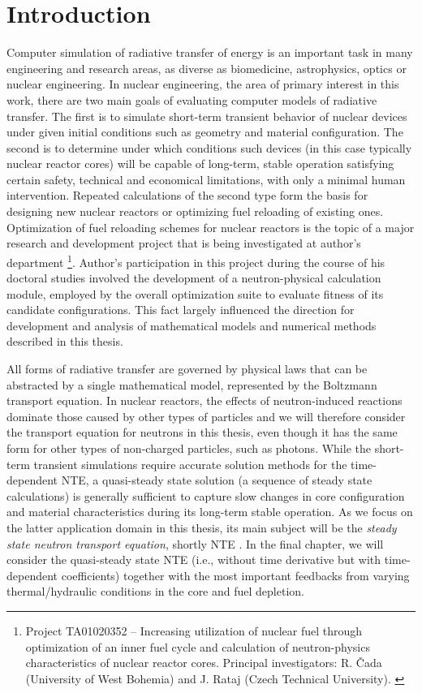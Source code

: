 \chapter{Introduction}

Computer simulation of radiative transfer of energy is an important task in many engineering and research areas, as
diverse as biomedicine, astrophysics, optics or nuclear engineering. In nuclear engineering, the area of primary
interest in this work, there are two main goals of evaluating computer models of radiative transfer. The first is
to simulate short-term transient behavior of nuclear devices under given initial conditions such as geometry and material
configuration. The second is to determine under which conditions such devices (in this case typically nuclear reactor
cores) will be capable of long-term, stable operation satisfying certain safety, technical and economical limitations,
with only a minimal human intervention. Repeated calculations of the second type form the basis for designing new
nuclear reactors or optimizing fuel reloading of existing ones. Optimization of fuel reloading schemes for nuclear
reactors is the topic of a major research and development project that is being investigated at author's department
\footnote{Project TA01020352 -- Increasing utilization of nuclear fuel through optimization of an inner fuel cycle and
calculation of neutron-physics characteristics of nuclear reactor cores. Principal investigators: R. {\v C}ada
(University of West Bohemia) and J. Rataj (Czech Technical University). \label{ftn:TACR}}.
Author's participation in this project during the course of his doctoral studies involved the development of a
neutron-physical calculation module, employed by the overall optimization suite to evaluate fitness of its candidate
configurations. This fact largely influenced the direction for development and analysis of mathematical models and
numerical methods described in this thesis.

All forms of radiative transfer are governed by physical laws that can be abstracted by a single mathematical model,
represented by the Boltzmann transport equation. In nuclear reactors, the effects of neutron-induced reactions dominate
those caused by other types of particles and we will therefore consider the transport equation for neutrons in this 
thesis, even though it has the same form for other types of non-charged particles, such as photons. While the
short-term transient simulations require accurate solution methods for the time-dependent NTE, a quasi-steady state solution (a sequence of steady state calculations) is generally sufficient
to capture slow changes in core configuration and material characteristics during its long-term stable operation.
As we focus on the latter application domain in this thesis, its main subject will be the \textit{steady
state neutron transport equation}, shortly NTE . In the final chapter, we will consider the quasi-steady
state NTE (i.e., without time derivative but with time-dependent coefficients) together with the most important feedbacks from
varying thermal/hydraulic conditions in the core and fuel depletion.

